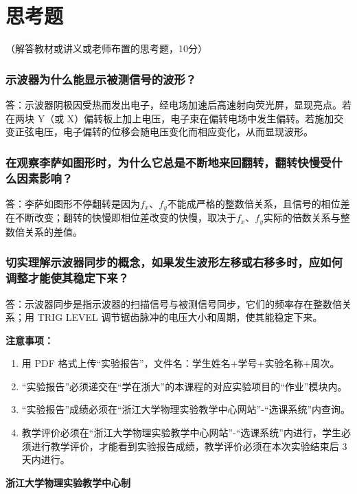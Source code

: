 \documentclass[10pt,a4paper]{ctexart}
\newcommand{\sihao}{\fontsize{14pt}{18pt}\selectfont}
\newcommand{\xiaosi}{\fontsize{12pt}{16pt}\selectfont}
\begin{document}
\section{思考题}

    \xiaosi （解答教材或讲义或老师布置的思考题，10分）

    \subsubsection*{示波器为什么能显示被测信号的波形？}
    
    答：示波器阴极因受热而发出电子，经电场加速后高速射向荧光屏，显现亮点。若在两块 Y（或 X）偏转板上加上电压，电子束在偏转电场中发生偏转。若施加交变正弦电压，电子偏转的位移会随电压变化而相应变化，从而显现波形。
    
    \subsubsection*{在观察李萨如图形时，为什么它总是不断地来回翻转，翻转快慢受什么因素影响？}
    
    答：李萨如图形不停翻转是因为\(f_x\)、\(f_y\)不能成严格的整数倍关系，且信号的相位差在不断改变；翻转的快慢即相位差改变的快慢，取决于\(f_x\)、\(f_y\)实际的倍数关系与整数倍关系的差值。    

    \subsubsection*{切实理解示波器同步的概念，如果发生波形左移或右移多时，应如何调整才能使其稳定下来？}

    答：示波器同步是指示波器的扫描信号与被测信号同步，它们的频率存在整数倍关系；用 TRIG LEVEL 调节锯齿脉冲的电压大小和周期，使其能稳定下来。
    
\newpage

\sihao\textbf{注意事项：}
\xiaosi
\begin{enumerate}
    \item  用 PDF 格式上传“实验报告”，文件名：学生姓名+学号+实验名称+周次。
    \item  “实验报告”必须递交在“学在浙大”的本课程的对应实验项目的“作业”模块内。
    \item  “实验报告”成绩必须在“浙江大学物理实验教学中心网站”-“选课系统”内查询。
    \item 教学评价必须在“浙江大学物理实验教学中心网站”-“选课系统”内进行，学生必须进行教学评价，才能看到实验报告成绩，教学评价必须在本次实验结束后 3 天内进行。
\end{enumerate}

\vspace{1cm}
\xiaosi\centering \textbf{浙江大学物理实验教学中心制}
\end{document}

